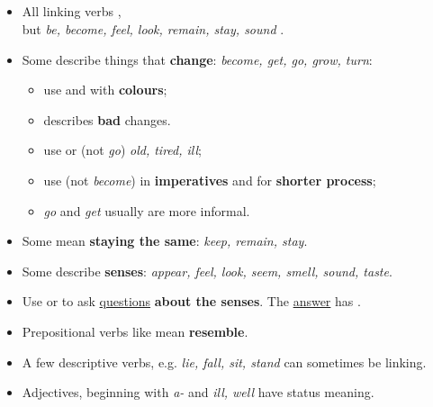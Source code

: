 \subsection{}
\begin{itemize}
    \item[\doot] All linking verbs ,\\
    but \textit{be, become, feel, look, remain, stay, sound} .
    \item[\doot] Some describe things that \textbf{change}: \textit{become, get, go, grow, turn}:
    \begin{itemize}
        \item[\daash] use  and  with \textbf{colours};
        \item[\daash]  describes \textbf{bad} changes.
        \item[\daash] use  or  (not \textit{go})  \textit{old, tired, ill};
        \item[\daash] use  (not \textit{become}) in \textbf{imperatives} and for \textbf{shorter process};
        \item[\aast] \textit{go} and \textit{get} usually are more informal.
    \end{itemize}
    \item[\doot] Some mean \textbf{staying the same}: \textit{keep, remain, stay}.
    \item[\doot] Some describe \textbf{senses}: \textit{appear, feel, look, seem, smell, sound, taste}.
    \item Use  or 
    to ask \underline{questions} \textbf{about the senses}.
    The \underline{answer} has .
    \item[\doot] Prepositional verbs like  mean \textbf{resemble}.
    \item[\aast] A few descriptive verbs, e.g. \textit{lie, fall, sit, stand} can sometimes be linking.
    \item[\aast] Adjectives, beginning with \textit{a-} and \textit{ill, well} have status meaning.
\end{itemize}

